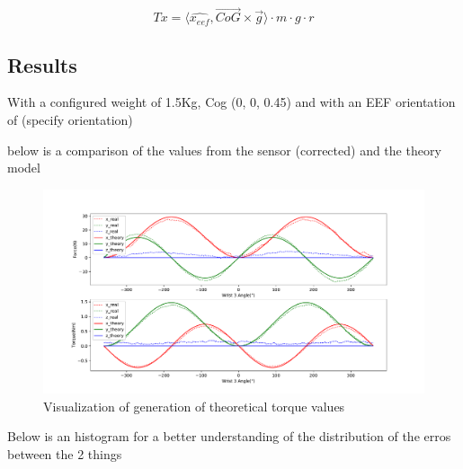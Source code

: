 \[ Tx = \langle\hat{x_{eef}} , \vec{CoG} \times \vec{g} \rangle \cdot m \cdot g\cdot r \]


\subsection{Results}

\par With a configured weight of 1.5Kg, Cog (0, 0, 0.45) and with an EEF orientation of (specify orientation)

\par below is a comparison of the values from the sensor (corrected) and the theory model

\begin{figure}[h]
    \centering
    \includegraphics[width=\linewidth]{figs/chp3/ft_sensor_theory.pdf}
    \caption{Visualization of generation of theoretical torque values}
    \label{fig:ft_sensor_theory}
\end{figure}



\par Below is an histogram for a better understanding of the distribution of the erros between the 2 things

